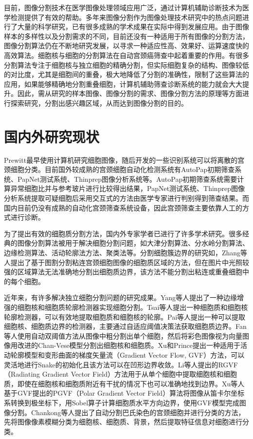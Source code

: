 \documentclass[nomlist,masters]{seuthesix}
\begin{document}
目前，图像分割技术在医学图像处理领域应用广泛，通过计算机辅助诊断技术为医学检测提供了有效的帮助。多年来图像分割作为图像处理技术研究中的热点问题进行了大量的科学研究，已有很多成熟的学术成果在实际中得到发展应用。由于图像样本的多样性以及分割需求的不同，目前还没有一种适用于所有图像的分割方法，图像分割算法仍在不断地研究发展，以寻求一种适应性高、效果好、运算速度快的高效算法。细胞核与细胞的分割算法在自动宫颈癌筛查中起着重要的作用。有很多分割算法专注于细胞核与独立细胞的精确分割，但实际细胞复杂的结构、图像较低的对比度，尤其是细胞间的重叠，极大地降低了分割的准确性，限制了这些算法的应用，如果能够精确地分割重叠细胞，计算机辅助筛查诊断系统的能力就会大大提升。因此，需从研究的样本图像、图像分割的需求、图像分割方法的原理等方面进行探索研究，分割出感兴趣区域，从而达到图像分割的目的。



\section{国内外研究现状}
Prewitt\cite{Prewitt1966The}最早使用计算机研究细胞图像，随后开发的一些识别系统可以将离散的宫颈细胞分类。目前国外较成熟的宫颈细胞自动化检测系统\cite{Stoler2000Advances}有AutoPap初期筛查系统、PapNet测试系统、Thinprep图像分析系统等。AutoPap初期筛查系统需要计算异常细胞比并与参考玻片进行比较得出结果，PapNet测试系统、Thinprep图像分析系统提取可疑细胞后采用交互式的方法由医学专家进行判别得到筛查结果。而国内目前仍没有成熟的自动化宫颈筛查系统设备，因此宫颈筛查主要依靠人工的方式进行诊断。

为了提出有效的细胞质分割方法，国内外专家学者已进行了许多学术研究。很多经典的图像分割算法被用于解决细胞分割问题，如大津分割算法、分水岭分割算法、边缘检测算法、活动轮廓法方法、聚类法等\cite{蔡隽2005基于活动轮廓模型的彩色白细胞图像自动分割方法研究,Hassanmbaga2015Pap,Gen2012Unsupervised,Zimmer2002Segmentation,FRANK2011EFFICIENT}。分割细胞簇边界的研究如，Zhang等人\cite{Zhang2014Cytoplasm,Zhang2014Segmentation}提出了基于图割分割粘连宫颈细胞图像的细胞质区域的方法，但在图片中光照较强的区域算法无法准确地分割出细胞质边界，该方法不能分割出粘连或重叠细胞中的每个细胞。

近年来，有许多解决独立细胞分割问题的研究成果。Yang等人\cite{Yang2008Edge}提出了一种边缘增强的细胞核和细胞质轮廓检测器实现细胞分割。Tsai等人\cite{Tsai2008Nucleus}提出一种细胞质和细胞核轮廓检测器，可以有效地提取细胞质和细胞核的轮廓。Pai等人\cite{Pai2012Nucleus}提出一种可以提取细胞核、细胞质边界的检测器，主要通过自适应阈值决策法\cite{Tsai2009An}获取细胞质边界。Fan等人\cite{Fan2013Color}使用自动双阈值方法从图像中粗分割出单个细胞，然后将彩色图像视为向量图像用改进的Chan-Vese模型分割出细胞核和细胞质。Xu和Prince\cite{Xu1998Snakes}提出一种适用于活动轮廓模型和变形曲面的梯度矢量流（Gradient Vector Flow, GVF）方法，可以灵活地进行Snake的初始化且该方法可以在凹形边界收敛。Li等人\cite{Li2012Cytoplasm}提出的RGVF（Radiating Gradient Vector Field）方法用于从单个细胞中提取细胞核和细胞质，即使在细胞核和细胞质附近有干扰的情况下也可以准确地找到边界。Xu等人\cite{Xu2013Cell}基于GVF提出的PGVF（Polar Gradient Vector Field）算法将图像从笛卡尔坐标系转换到极坐标下，用Sobel算子计算细胞质水平方向边界，使用GVF模型完成图像分割。Chankong等人\cite{Chankong2014Automatic}提出了自动分割巴氏染色的宫颈细胞并进行分类的方法，先将图像像素模糊分类为细胞核、细胞质、背景，然后提取特征信息对细胞进行分类。
\end{document}
